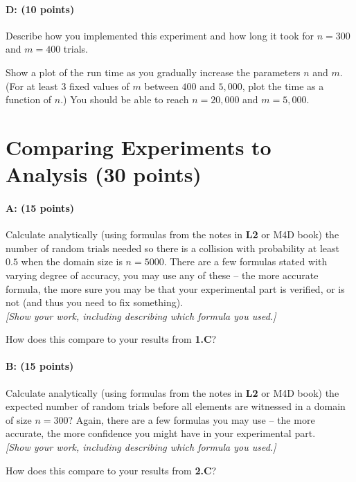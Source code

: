 \documentclass[11pt]{article}
\begin{document}
\paragraph{D: (10 points)} 
Describe how you implemented this experiment and how long it took for $n=300$ and $m=400$ trials.  

Show a plot of the run time as you gradually increase the parameters $n$ and $m$.  
(For at least 3 fixed values of $m$ between $400$ and $5{,}000$, plot the time as a function of $n$.)
You should be able to reach $n = 20{,}000$ and $m = 5{,}000$.  

\section{Comparing Experiments to Analysis (30 points)}

\paragraph{A: (15 points)}
Calculate analytically (using formulas from the notes in \textbf{L2} or M4D book) the number of random trials needed so there is a collision with probability at least $0.5$ when the domain size is $n = 5000$.  There are a few formulas stated with varying degree of accuracy, you may use any of these -- the more accurate formula, the more sure you may be that your experimental part is verified, or is not (and thus you need to fix something).  
\\ \emph{[Show your work, including describing which formula you used.]}

How does this compare to your results from  {\textbf{\sffamily 1.C}}?  

\paragraph{B: (15 points)}
Calculate analytically (using formulas from the notes in \textbf{L2} or M4D book) the expected number of random trials before all elements are witnessed in a domain of size $n=300$?  Again, there are a few formulas you may use -- the more accurate, the more confidence you might have in your experimental part.  
\\ \emph{[Show your work, including describing which formula you used.]}

How does this compare to your results from  {\textbf{\sffamily 2.C}}?
\end{document}
